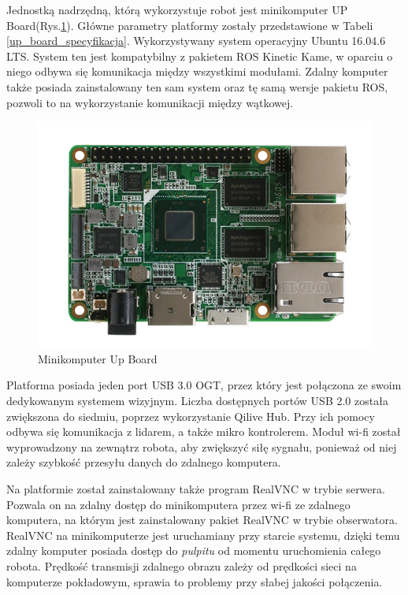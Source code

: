 Jednostką nadrzędną, którą wykorzystuje robot jest minikomputer UP Board(Rys.\ref{fig:upboard}). Główne parametry platformy zostały przedstawione w Tabeli \ref{up_board_specyfikacja}. Wykorzystywany system operacyjny Ubuntu 16.04.6 LTS. System ten jest kompatybilny z pakietem ROS Kinetic Kame, w oparciu o niego odbywa się komunikacja między wszystkimi modułami. Zdalny komputer także posiada zainstalowany ten sam system oraz tę samą wersje pakietu ROS, pozwoli to na wykorzystanie komunikacji między wątkowej. 

\begin{figure}[ht]
	\centering
	\includegraphics[scale=0.6]{upboard.png}
	\caption{Minikomputer Up Board}
	\label{fig:upboard}
\end{figure}

Platforma posiada jeden port USB 3.0 OGT, przez który jest połączona ze swoim dedykowanym systemem wizyjnym. Liczba dostępnych portów USB 2.0 została zwiększona do siedmiu, poprzez wykorzystanie Qilive Hub. Przy ich pomocy odbywa się komunikacja z lidarem, a także mikro kontrolerem. Moduł wi-fi został wyprowadzony na zewnątrz robota, aby zwiększyć siłę sygnału, ponieważ od niej zależy szybkość przesyłu danych do zdalnego komputera. 

Na platformie został zainstalowany także program RealVNC w trybie serwera. Pozwala on na zdalny dostęp do minikomputera przez wi-fi ze zdalnego komputera, na którym jest zainstalowany pakiet RealVNC w trybie obserwatora. RealVNC na minikomputerze jest uruchamiany przy starcie systemu, dzięki temu zdalny komputer posiada dostęp do \textit{pulpitu} od momentu uruchomienia całego robota. Prędkość transmisji zdalnego obrazu zależy od prędkości sieci na komputerze pokładowym, sprawia to problemy przy słabej jakości połączenia. 

